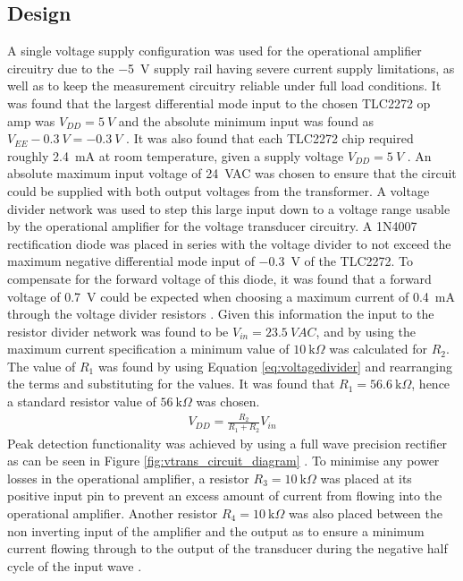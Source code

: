 \subsection{Design} \label{sec:vtrans_design}
A single voltage supply configuration was used for the operational amplifier circuitry due to the \SI{-5}{V} supply rail having severe current supply limitations, as well as to keep the measurement circuitry reliable under full load conditions. It was found that the largest differential mode input to the chosen TLC2272 op amp was $V_{DD}=\SI{5}{V}$ and the absolute minimum input was found as $V_{EE}-\SI{0.3}{V}=\SI{-0.3}{V}$ \cite{TLC2272:2016}. It was also found that each TLC2272 chip required roughly \SI{2.4}{\milli A} at room temperature, given a supply voltage $V_{DD}=\SI{5}{V}$ \cite{TLC2272:2016}. An absolute maximum input voltage of \SI{24}{VAC} was chosen to ensure that the circuit could be supplied with both output voltages from the transformer. A voltage divider network was used to step this large input down to a voltage range usable by the operational amplifier for the voltage transducer circuitry.\vspace{4mm} \newline A 1N4007 rectification diode was placed in series with the voltage divider to not exceed the maximum negative differential mode input of \SI{-0.3}{V} of the TLC2272. To compensate for the forward voltage of this diode, it was found that a forward voltage of \SI{0.7}{V} could be expected when choosing a maximum current of \SI{0.4}{\milli A} through the voltage divider resistors \cite{1N4007:2014}. %
Given this information the input to the resistor divider network was found to be $V_{in}=\SI{23.5}{VAC}$, and by using the maximum current specification a minimum value of $\SI{10}{\kilo \Omega}$ was calculated for $R_{2}$. The value of $R_{1}$ was found by using Equation \ref{eq:voltagedivider} and rearranging the terms and substituting for the values. It was found that $R_{1}=\SI{56.6}{\kilo \Omega}$, hence a standard resistor value of $\SI{56}{\kilo \Omega}$ was chosen.
\begin{align}
   V_{DD}=\frac{R_2}{R_1+R_2}V_{in}
   \label{eq:voltagedivider}
\end{align}
Peak detection functionality was achieved by using a full wave precision rectifier as can be seen in Figure \ref{fig:vtrans_circuit_diagram} \cite{PrecisionRectifierFullwave}. To minimise any power losses in the operational amplifier, a resistor $R_3=\SI{10}{\kilo \Omega}$ was placed at its positive input pin to prevent an excess amount of current from flowing into the operational amplifier. Another resistor $R_4=\SI{10}{\kilo \Omega}$ was also placed between the non inverting input of the amplifier and the output as to ensure a minimum current flowing through to the output of the transducer during the negative half cycle of the input wave \cite{PrecisionRectifierFullwave}. 
